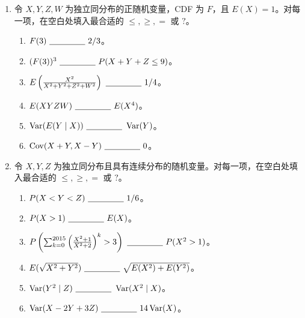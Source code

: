 \documentclass[UTF8,12pt,a4paper,fontset=fandol]{ctexart}
\begin{document}
\begin{enumerate}
  \item 令 $X,Y,Z,W$ 为独立同分布的正随机变量，CDF 为 $F$，且 $E(X)=1$。对每一项，在空白处填入最合适的 $\le,\ge,=$ 或 $?$。
  \begin{enumerate}
    \item $F(3)\ \underline{\hspace{1.5cm}}\ 2/3$。
    \item $(F(3))^3\ \underline{\hspace{1.5cm}}\ P(X+Y+Z\le 9)$。
    \item $E\left(\frac{X^2}{X^2+Y^2+Z^2+W^2}\right)\ \underline{\hspace{1.5cm}}\ 1/4$。
    \item $E(XYZW)\ \underline{\hspace{1.5cm}}\ E(X^4)$。
    \item $\operatorname{Var}(E(Y\mid X))\ \underline{\hspace{1.5cm}}\ \operatorname{Var}(Y)$。
    \item $\operatorname{Cov}(X+Y,X-Y)\ \underline{\hspace{1.5cm}}\ 0$。
  \end{enumerate}

  \item 令 $X,Y,Z$ 为独立同分布且具有连续分布的随机变量。对每一项，在空白处填入最合适的 $\le,\ge,=$ 或 $?$。
  \begin{enumerate}
    \item $P(X<Y<Z)\ \underline{\hspace{1.5cm}}\ 1/6$。
    \item $P(X>1)\ \underline{\hspace{1.5cm}}\ E(X)$。
    \item $P\left(\sum_{k=0}^{2015}\left(\frac{X^2+1}{X^2+2}\right)^k>3\right)\ \underline{\hspace{1.5cm}}\ P(X^2>1)$。
    \item $E(\sqrt{X^2+Y^2})\ \underline{\hspace{1.5cm}}\ \sqrt{E(X^2)+E(Y^2)}$。
    \item $\operatorname{Var}(Y^2\mid Z)\ \underline{\hspace{1.5cm}}\ \operatorname{Var}(X^2\mid X)$。
    \item $\operatorname{Var}(X-2Y+3Z)\ \underline{\hspace{1.5cm}}\ 14\operatorname{Var}(X)$。
  \end{enumerate}


\end{enumerate}
\end{document}
